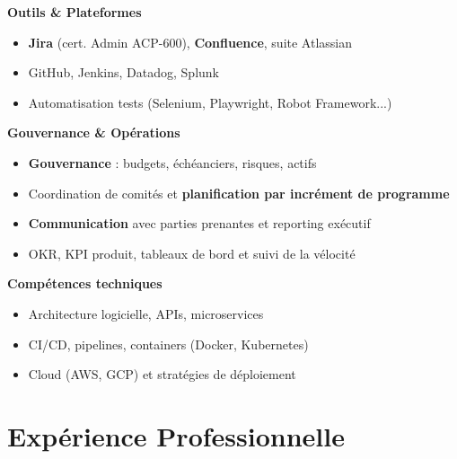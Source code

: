 \documentclass[11pt,a4paper]{article}
\newcommand{\highlight}[1]{\textcolor{primaryblue}{\textbf{#1}}}
\newcommand{\skilltitle}[1]{\normalsize\textcolor{primaryblue}{\textbf{#1}}}
\begin{document}
\hfill
\begin{minipage}[t]{0.42\textwidth}
\skilltitle{Outils \& Plateformes}
\begin{itemize}[leftmargin=10pt]
    \item \highlight{Jira} (cert. Admin ACP-600), \highlight{Confluence}, suite Atlassian
    \item GitHub, Jenkins, Datadog, Splunk
    \item Automatisation tests (Selenium, Playwright, Robot Framework...)
\end{itemize}

\skilltitle{Gouvernance \& Opérations}
\begin{itemize}[leftmargin=10pt]
    \item \highlight{Gouvernance} : budgets, échéanciers, risques, actifs
    \item Coordination de comités et \highlight{planification par incrément de programme}
    \item \highlight{Communication} avec parties prenantes et reporting exécutif
    \item OKR, KPI produit, tableaux de bord et suivi de la vélocité
\end{itemize}

\skilltitle{Compétences techniques}
\begin{itemize}[leftmargin=10pt]
    \item Architecture logicielle, APIs, microservices
    \item CI/CD, pipelines, containers (Docker, Kubernetes)
    \item Cloud (AWS, GCP) et stratégies de déploiement
\end{itemize}
\end{minipage}


\section*{Expérience Professionnelle}
\end{document}
